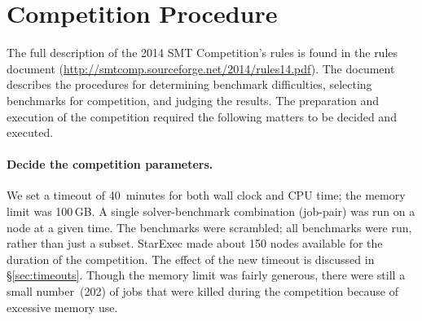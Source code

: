 \documentclass[twoside,11pt]{article}
\begin{document}
\section{Competition Procedure}
\label{sec:procedure}

The full description of the 2014 SMT Competition's rules is found in the rules document (\url{http://smtcomp.sourceforge.net/2014/rules14.pdf}). The document describes the procedures for determining benchmark difficulties, selecting benchmarks for competition, and judging the results. The preparation and execution of the competition required the following matters to be decided and executed.

\paragraph{Decide the competition parameters.} We set a timeout of 40~minutes for both wall clock and CPU time; the memory limit was 100\,GB. A single solver-benchmark combination (job-pair) was run on a node at a given time. The benchmarks were scrambled; all benchmarks were run, rather than just a subset. StarExec made about 150 nodes available for the duration of the competition.
The effect of the new timeout is discussed in \S\ref{sec:timeouts}. Though the memory limit was fairly generous, there were still a small number~(202) of jobs that were killed during the competition because of excessive memory use.
\end{document}

